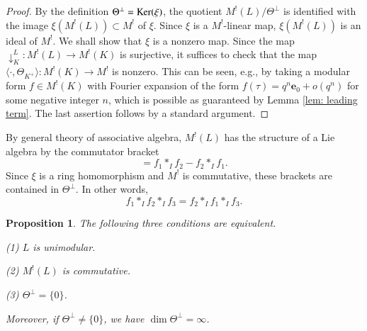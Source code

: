 \documentclass[12pt]{amsart}
\numberwithin{equation}{section}
\newtheorem{proposition}[theorem]{Proposition}
\theoremstyle{definition}
\theoremstyle{remark}
\newcommand{\pushLK}{\downarrow^{L}_{K}}
\newcommand{\ThetaK}{\Theta_{K^{+}}}
\newcommand{\ML}{M^{!}(L)}
\begin{document}
\begin{proof}
By the definition $\Theta^{\perp}={\rm Ker}(\xi)$, 
the quotient ${\ML}/\Theta^{\perp}$ is identified with 
the image $\xi({\ML})\subset M^!$ of $\xi$. 
Since $\xi$ is a $M^!$-linear map, 
$\xi({\ML})$ is an ideal of $M^!$. 
We shall show that $\xi$ is a nonzero map. 
Since the map ${\pushLK}\colon {\ML}\to M^{!}(K)$ is surjective, 
it suffices to check that the map 
$\langle \cdot , {\ThetaK} \rangle \colon M^!(K)\to M^{!}$ is nonzero. 
This can be seen, e.g., by taking a modular form $f\in M^!(K)$ 
with Fourier expansion of the form 
$f(\tau)=q^{n}\mathbf{e}_{0}+o(q^{n})$ 
for some negative integer $n$,  
which is possible as guaranteed by Lemma \ref{lem: leading term}.  
The last assertion follows by a standard argument. 
\end{proof}

By general theory of associative algebra, 
${\ML}$ has the structure of a Lie algebra by the commutator bracket 
\begin{equation*}
[ f_1, f_2 ] = f_1\ast_{I} f_2 - f_2\ast_{I} f_1. 
\end{equation*}
Since $\xi$ is a ring homomorphism and $M^!$ is commutative, 
these brackets are contained in $\Theta^{\perp}$. 
In other words, 
\begin{equation*}
f_1\ast_{I} f_2\ast_{I} f_3 = f_2\ast_{I} f_1\ast_{I} f_3. 
\end{equation*}

\begin{proposition}\label{prop: unimodular commutative} 
The following three conditions are equivalent. 

(1) $L$ is unimodular. 

(2) ${\ML}$ is commutative. 

(3) $\Theta^{\perp} = \{ 0 \}$. 

\noindent
Moreover, if $\Theta^{\perp}\ne \{ 0 \}$, we have $\dim \Theta^{\perp} = \infty$. 
\end{proposition}
\end{document}
